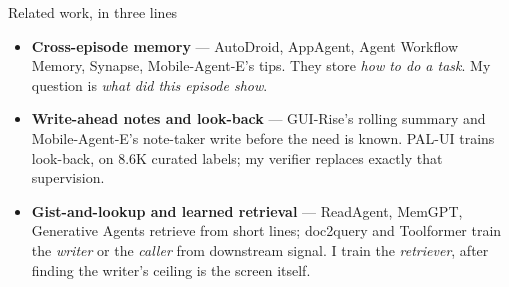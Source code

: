 \documentclass[aspectratio=169,10pt]{beamer}
\begin{document}
\begin{frame}{Related work, in three lines}
\vspace{0.5cm}
\begin{itemize}\setlength\itemsep{0.85em}
\item \textbf{Cross-episode memory} --- AutoDroid, AppAgent, Agent Workflow Memory, Synapse, Mobile-Agent-E's tips. They store \emph{how to do a task}. My question is \emph{what did this episode show}.
\item \textbf{Write-ahead notes and look-back} --- GUI-Rise's rolling summary and Mobile-Agent-E's note-taker write before the need is known. PAL-UI trains look-back, on 8.6K curated labels; my verifier replaces exactly that supervision.
\item \textbf{Gist-and-lookup and learned retrieval} --- ReadAgent, MemGPT, Generative Agents retrieve from short lines; doc2query and Toolformer train the \emph{writer} or the \emph{caller} from downstream signal. I train the \emph{retriever}, after finding the writer's ceiling is the screen itself.
\end{itemize}
\end{frame}
\end{document}
